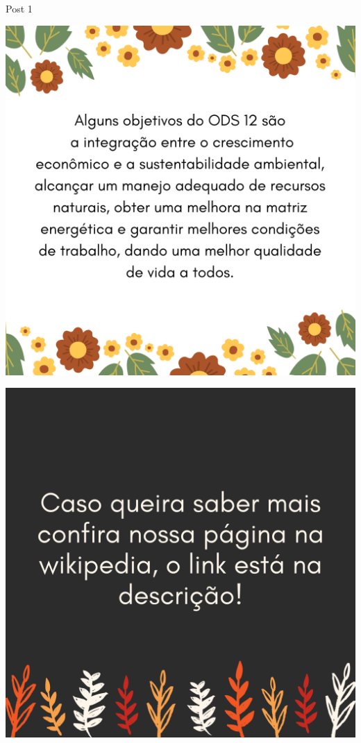 \documentclass{beamer}
\begin{document}
	\begin{frame}{Post 1}
		\begin{minipage}{0.49\linewidth}
			\centering
			\includegraphics[width=\linewidth]{Post 1/3.png}
		\end{minipage}
		\hfill
		\begin{minipage}{0.49\linewidth}
			\centering
			\includegraphics[width=\linewidth]{Post 1/4.png}
		\end{minipage}
	\end{frame}
\end{document}
